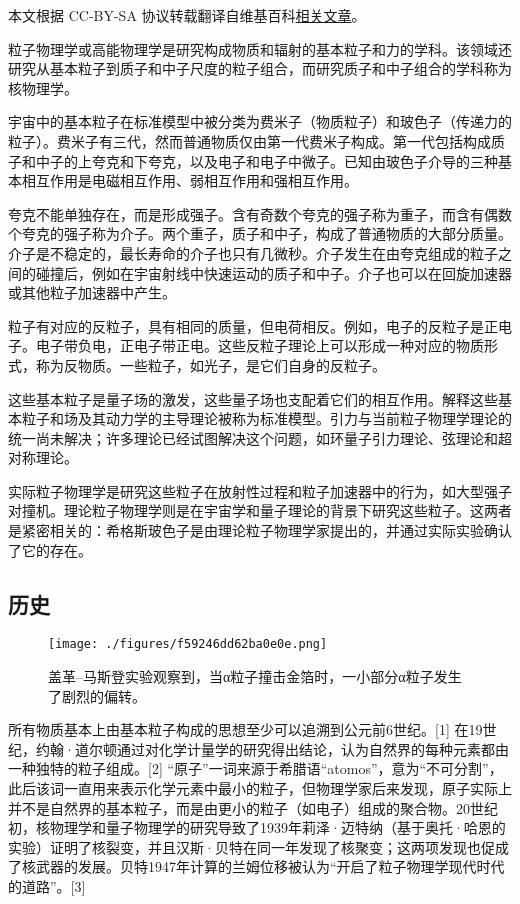 
本文根据 CC-BY-SA 协议转载翻译自维基百科\href{https://en.wikipedia.org/wiki/Particle_physics}{相关文章}。

粒子物理学或高能物理学是研究构成物质和辐射的基本粒子和力的学科。该领域还研究从基本粒子到质子和中子尺度的粒子组合，而研究质子和中子组合的学科称为核物理学。

宇宙中的基本粒子在标准模型中被分类为费米子（物质粒子）和玻色子（传递力的粒子）。费米子有三代，然而普通物质仅由第一代费米子构成。第一代包括构成质子和中子的上夸克和下夸克，以及电子和电子中微子。已知由玻色子介导的三种基本相互作用是电磁相互作用、弱相互作用和强相互作用。

夸克不能单独存在，而是形成强子。含有奇数个夸克的强子称为重子，而含有偶数个夸克的强子称为介子。两个重子，质子和中子，构成了普通物质的大部分质量。介子是不稳定的，最长寿命的介子也只有几微秒。介子发生在由夸克组成的粒子之间的碰撞后，例如在宇宙射线中快速运动的质子和中子。介子也可以在回旋加速器或其他粒子加速器中产生。

粒子有对应的反粒子，具有相同的质量，但电荷相反。例如，电子的反粒子是正电子。电子带负电，正电子带正电。这些反粒子理论上可以形成一种对应的物质形式，称为反物质。一些粒子，如光子，是它们自身的反粒子。

这些基本粒子是量子场的激发，这些量子场也支配着它们的相互作用。解释这些基本粒子和场及其动力学的主导理论被称为标准模型。引力与当前粒子物理学理论的统一尚未解决；许多理论已经试图解决这个问题，如环量子引力理论、弦理论和超对称理论。

实际粒子物理学是研究这些粒子在放射性过程和粒子加速器中的行为，如大型强子对撞机。理论粒子物理学则是在宇宙学和量子理论的背景下研究这些粒子。这两者是紧密相关的：希格斯玻色子是由理论粒子物理学家提出的，并通过实际实验确认了它的存在。
\subsection{历史}
\begin{figure}[ht]
\centering
\texttt{[image: ./figures/f59246dd62ba0e0e.png]}
\caption{盖革–马斯登实验观察到，当α粒子撞击金箔时，一小部分α粒子发生了剧烈的偏转。} \label{fig_Partic_1}
\end{figure}
所有物质基本上由基本粒子构成的思想至少可以追溯到公元前6世纪。[1] 在19世纪，约翰·道尔顿通过对化学计量学的研究得出结论，认为自然界的每种元素都由一种独特的粒子组成。[2] “原子”一词来源于希腊语“atomos”，意为“不可分割”，此后该词一直用来表示化学元素中最小的粒子，但物理学家后来发现，原子实际上并不是自然界的基本粒子，而是由更小的粒子（如电子）组成的聚合物。20世纪初，核物理学和量子物理学的研究导致了1939年莉泽·迈特纳（基于奥托·哈恩的实验）证明了核裂变，并且汉斯·贝特在同一年发现了核聚变；这两项发现也促成了核武器的发展。贝特1947年计算的兰姆位移被认为“开启了粒子物理学现代时代的道路”。[3]

